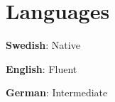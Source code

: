 \documentclass[a4paper,11pt]{article}
\begin{document}
\section{\textbf{Languages}}
\begin{itemize}[leftmargin=0.05in, label={}]
\small{
    \item{\textbf{Swedish}: Native}
    \item{\textbf{English}: Fluent}
    \item{\textbf{German}: Intermediate}
}
\end{itemize}
\vspace{-16pt}
\end{document}
